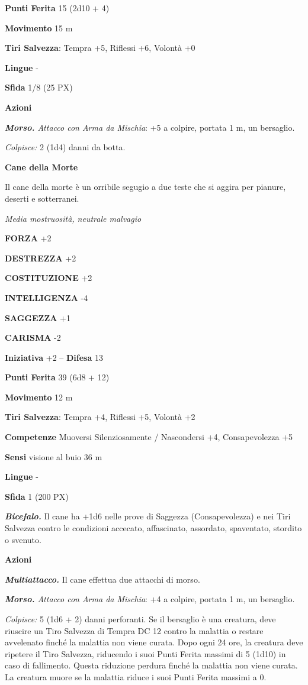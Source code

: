 \begin{multicols}{2}
\textbf{Punti Ferita} 15 (2d10 + 4)

\textbf{Movimento} 15 m

\textbf{Tiri Salvezza}: Tempra +5, Riflessi +6, Volontà +0

\textbf{Lingue} -

\textbf{Sfida} 1/8 (25 PX)

\textbf{Azioni}

\textit{\textbf{Morso.} Attacco con Arma da Mischia}: +5 a colpire, portata 1 m, un bersaglio.

\textit{Colpisce:} 2 (1d4) danni da botta.

\medskip\textbf{Cane della Morte}

Il cane della morte è un orribile segugio a due teste che si aggira per pianure, deserti e sotterranei.

\textit{Media mostruosità, neutrale malvagio}

\textbf{FORZA} +2

\textbf{DESTREZZA} +2

\textbf{COSTITUZIONE} +2

\textbf{INTELLIGENZA} -4

\textbf{SAGGEZZA} +1

\textbf{CARISMA} -2

\textbf{Iniziativa} +2 -- \textbf{Difesa} 13

\textbf{Punti Ferita} 39 (6d8 + 12)

\textbf{Movimento} 12 m

\textbf{Tiri Salvezza}: Tempra +4, Riflessi +5, Volontà +2

\textbf{Competenze} Muoversi Silenziosamente / Nascondersi +4, Consapevolezza +5

\textbf{Sensi} visione al buio 36 m

\textbf{Lingue} -

\textbf{Sfida} 1 (200 PX)

\textit{\textbf{Bicefalo.}} Il cane ha +1d6 nelle prove di Saggezza (Consapevolezza) e nei Tiri Salvezza contro le condizioni accecato, affascinato, assordato, spaventato, stordito o svenuto.

\textbf{Azioni}

\textit{\textbf{Multiattacco.}} Il cane effettua due attacchi di morso.

\textit{\textbf{Morso.} Attacco con Arma da Mischia}: +4 a colpire, portata 1 m, un bersaglio.

\textit{Colpisce:} 5 (1d6 + 2) danni perforanti. Se il bersaglio è una creatura, deve riuscire un Tiro Salvezza di Tempra DC 12 contro la malattia o restare avvelenato finché la malattia non viene curata. Dopo ogni 24 ore, la creatura deve ripetere il Tiro Salvezza, riducendo i suoi Punti Ferita massimi di 5 (1d10) in caso di fallimento. Questa riduzione perdura finché la malattia non viene curata. La creatura muore se la malattia riduce i suoi Punti Ferita massimi a 0.


\end{multicols}
